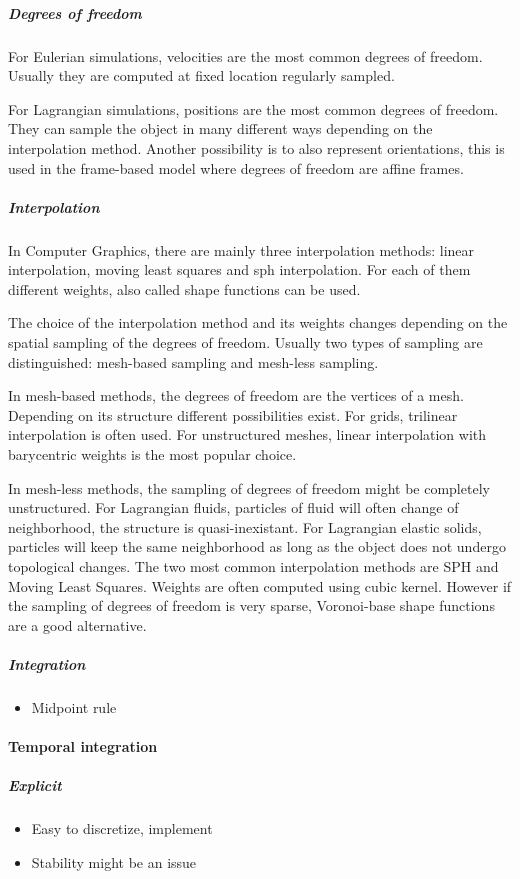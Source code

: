 \subparagraph{Degrees of freedom}
For Eulerian simulations, velocities are the most common degrees of freedom. Usually they are computed at fixed location regularly sampled.

For Lagrangian simulations, positions are the most common degrees of freedom. They can sample the object in many different ways depending on the interpolation method. Another possibility is to also represent orientations, this is used in the frame-based model where degrees of freedom are affine frames.

\subparagraph{Interpolation}
In Computer Graphics, there are mainly three interpolation methods: linear interpolation, moving least squares and sph interpolation. For each of them different weights, also called shape functions can be used. 

The choice of the interpolation method and its weights changes depending on the spatial sampling of the degrees of freedom. Usually two types of sampling are distinguished: mesh-based sampling and mesh-less sampling.

In mesh-based methods, the degrees of freedom are the vertices of a mesh. Depending on its structure different possibilities exist. For grids, trilinear interpolation is often used. For unstructured meshes, linear interpolation with barycentric weights is the most popular choice.

In mesh-less methods, the sampling of degrees of freedom might be completely unstructured. For Lagrangian fluids, particles of fluid will often change of neighborhood, the structure is quasi-inexistant. For Lagrangian elastic solids, particles will keep the same neighborhood as long as the object does not undergo topological changes. The two most common interpolation methods are SPH and Moving Least Squares. Weights are often computed using cubic kernel. However if the sampling of degrees of freedom is very sparse, Voronoi-base shape functions are a good alternative.

\subparagraph{Integration}

\begin{itemize}
\item Midpoint rule
\end{itemize}

\paragraph{Temporal integration}

\subparagraph{Explicit}
\begin{itemize}
\item Easy to discretize, implement
\item Stability might be an issue
\end{itemize}

